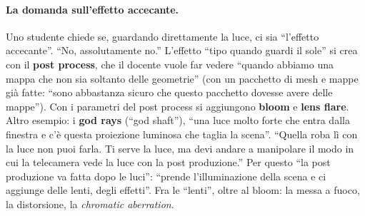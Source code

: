 \paragraph{La domanda sull'effetto accecante.} Uno studente chiede se, guardando
direttamente la luce, ci sia ``l'effetto accecante''. ``No, assolutamente no.'' L'effetto
``tipo quando guardi il sole'' si crea con il \textbf{post process}, che il docente vuole
far vedere ``quando abbiamo una mappa che non sia soltanto delle geometrie'' (con un
pacchetto di mesh e mappe già fatte: ``sono abbastanza sicuro che questo pacchetto dovesse
avere delle mappe''). Con i parametri del post process si aggiungono \textbf{bloom} e
\textbf{lens flare}. Altro esempio: i \textbf{god rays} (``god shaft''), ``una luce molto
forte che entra dalla finestra e c'è questa proiezione luminosa che taglia la scena''.
``Quella roba lì con la luce non puoi farla. Ti serve la luce, ma devi andare a manipolare
il modo in cui la telecamera vede la luce con la post produzione.'' Per questo ``la post
produzione va fatta dopo le luci'': ``prende l'illuminazione della scena e ci aggiunge delle
lenti, degli effetti''. Fra le ``lenti'', oltre al bloom: la messa a fuoco, la distorsione,
la \emph{chromatic aberration}.

